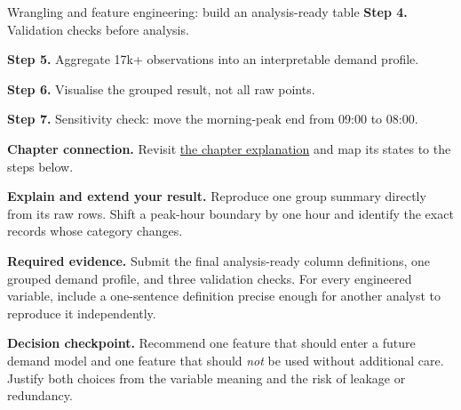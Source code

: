 \begin{labproject}{Wrangling and feature engineering: build an analysis-ready table}
\noindent\textbf{Step 4.} Validation checks before analysis.


\noindent\textbf{Step 5.} Aggregate 17k+ observations into an interpretable demand profile.


\noindent\textbf{Step 6.} Visualise the grouped result, not all raw points.


\noindent\textbf{Step 7.} Sensitivity check: move the morning-peak end from 09:00 to 08:00.

\textbf{Chapter connection.} Revisit \hyperref[ch:wrangling]{the chapter explanation} and map its states to the steps below.


\begin{verification}
\textbf{Explain and extend your result.} Reproduce one group summary directly from its raw rows. Shift a peak-hour boundary by one hour and identify the exact records whose category changes.


\textbf{Required evidence.} Submit the final analysis-ready column definitions, one grouped demand profile, and three validation checks. For every engineered variable, include a one-sentence definition precise enough for another analyst to reproduce it independently.

\textbf{Decision checkpoint.} Recommend one feature that should enter a future demand model and one feature that should \emph{not} be used without additional care. Justify both choices from the variable meaning and the risk of leakage or redundancy.
\end{verification}
\end{labproject}
